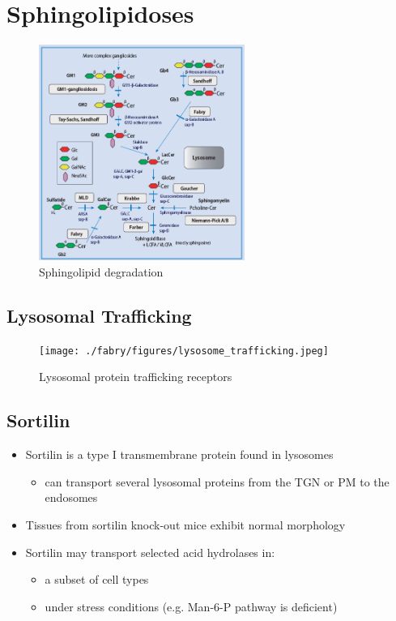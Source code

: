 \documentclass{scrartcl}
\begin{document}
\section{Sphingolipidoses}
\label{sec:orgff0aa01}

\begin{figure}[htbp]
\centering
\includegraphics[width=0.6\textwidth]{./figures/sl_degradation.png}
\caption{\label{fig:orgd7df22a}
Sphingolipid degradation}
\end{figure}

\subsection{Lysosomal Trafficking}
\label{sec:orgb246e05}

\begin{figure}[htbp]
\centering
\texttt{[image: ./fabry/figures/lysosome\_trafficking.jpeg]}
\caption[Lysosomal protein trafficking receptors]{\label{fig:orgb5e0cd6}
Lysosomal protein trafficking receptors}
\end{figure}

\subsection{Sortilin}
\label{sec:org60d77bb}

\begin{itemize}
\item Sortilin is a type I transmembrane protein found in lysosomes
\begin{itemize}
\item can transport several lysosomal proteins from the TGN or PM to the endosomes
\end{itemize}
\item Tissues from sortilin knock-out mice exhibit normal morphology
\item Sortilin may transport selected acid hydrolases in:
\begin{itemize}
\item a subset of cell types
\item under stress conditions (e.g. Man-6-P pathway is deficient)
\end{itemize}
\end{itemize}
\end{document}
